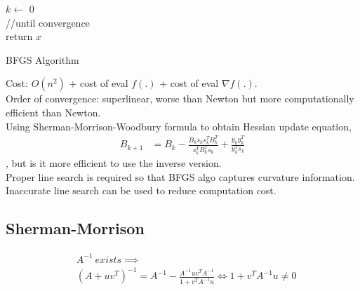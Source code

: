 \documentclass[8pt,letter]{article}
\begin{document}
\begin{multicols*}{2}
  \begin{algorithm}[H]
    $k \leftarrow$ 0\\
    //until convergence\\
    return $x$
    \caption{BFGS Algorithm\label{Algo_BFGS}}
  \end{algorithm}

  Cost: $O(n^2)$ + cost of eval $f(.)$ + cost of eval $\nabla f(.)$.\\
  Order of convergence: superlinear, worse than Newton but more computationally efficient than Newton.\\   
  
  Using Sherman-Morrison-Woodbury formula to obtain Hessian update equation,
  \begin{align*}
    B_{k+1} & = B_k - \frac{B_ks_k s_k^T B_k^T}{s_k^T B_k^T s_k} + \frac{y_k y_k^T}{y_k^T s_k}
  \end{align*}
  , but is it more efficient to use the inverse version.\\
  
  Proper line search is required so that BFGS algo captures curvature information.\\
  
  Inaccurate line search can be used to reduce computation cost.

  \subsection{Sherman-Morrison}
  \begin{align*}
    & A^{-1}\ exists \implies\\
    & (A+uv^T)^{-1} = A^{-1} - \frac{A^{-1}uv^TA^{-1}}{1+v^TA^{-1}u} \iff 1 + v^T A^{-1} u \neq 0
  \end{align*}


\end{multicols*}
\end{document}
